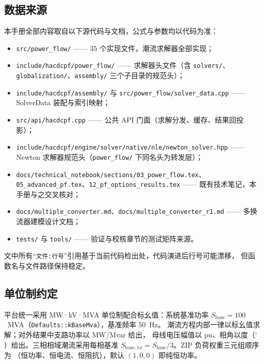 \documentclass[UTF8,fontset=windows,a4paper,11pt]{ctexart}
\begin{document}
\subsection{数据来源}
本手册全部内容取自以下源代码与文档，公式与参数均以代码为准：
\begin{itemize}
  \item \texttt{src/power\_flow/} —— 35 个实现文件，潮流求解器全部实现；
  \item \texttt{include/hacdcpf/power\_flow/} —— 求解器头文件（含 \texttt{solvers/}、
        \texttt{globalization/}、\texttt{assembly/} 三个子目录的规范头）；
  \item \texttt{include/hacdcpf/assembly/} 与 \texttt{src/power\_flow/solver\_data.cpp} ——
        SolverData 装配与索引映射；
  \item \texttt{src/api/hacdcpf.cpp} —— 公共 API 门面（求解分发、缓存、结果回投影）；
  \item \texttt{include/hacdcpf/engine/solver/native/nle/newton\_solver.hpp} ——
        Newton 求解器规范头（\texttt{power\_flow/} 下同名头为转发层）；
  \item \texttt{docs/technical\_notebook/sections/03\_power\_flow.tex}、
        \texttt{05\_advanced\_pf.tex}、\texttt{12\_pf\_options\_results.tex} ——
        既有技术笔记，本手册与之交叉核对；
  \item \texttt{docs/multiple\_converter.md}、\texttt{docs/multiple\_converter\_r1.md} ——
        多换流器建模设计文档；
  \item \texttt{tests/} 与 \texttt{tools/} —— 验证与校核章节的测试矩阵来源。
\end{itemize}
文中所有“\texttt{文件:行号}”引用基于当前代码检出处，代码演进后行号可能漂移，
但函数名与文件路径保持稳定。

\subsection{单位制约定}
平台统一采用 MW·kV·MVA 单位制配合标幺值：系统基准功率
$S_{\mathrm{base}}=100$~MVA（\texttt{Defaults::kBaseMva}），基准频率 50~Hz。
潮流方程内部一律以标幺值求解；对外结果中支路功率以 MW/Mvar 给出，
母线电压幅值以 pu、相角以度（$^\circ$）给出。三相相域潮流采用每相基准
$S_{\mathrm{base},1\phi}=S_{\mathrm{base}}/3$。ZIP 负荷权重三元组顺序为
（恒功率、恒电流、恒阻抗），默认 $(1,0,0)$ 即纯恒功率。
\end{document}

